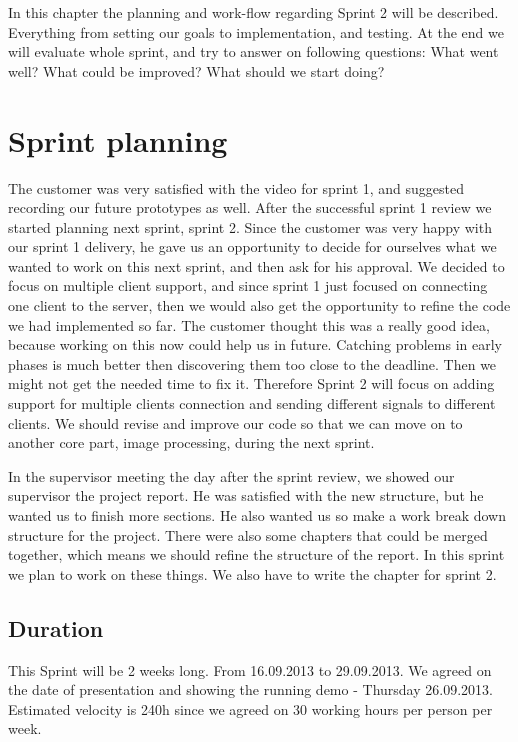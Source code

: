 In this chapter the planning and work-flow regarding Sprint 2 will be described. 
Everything from setting our goals to implementation, and testing. At the end we will evaluate whole sprint, and try to answer on following questions: What went well? What could be improved? What should we start doing? 

\section{Sprint planning}
The customer was very satisfied with the video for sprint 1, and suggested recording our future prototypes as well. 
After the successful sprint 1 review we started planning next sprint, sprint 2. Since the customer was very happy with our sprint 1 delivery, he gave us an opportunity to decide for ourselves what we wanted to work on this next sprint, and then ask for his approval. 
We decided to focus on multiple client support, and since sprint 1 just focused on connecting one client to the server, then we would also get the opportunity to refine the code we had implemented so far. The customer thought this was a really good idea, because working on this now could help us in future. Catching problems in early phases is much better then discovering them too close to the deadline. Then we might not get the needed time to fix it. Therefore Sprint 2 will focus on adding support for multiple clients connection and sending different signals to different clients. We should revise and improve our code so that we can move on to another core part, image processing, during the next sprint.


In the supervisor meeting the day after the sprint review, we showed our supervisor the project report. He was satisfied with the new structure, but he wanted us to finish more sections. He also wanted us so make a work break down structure for the project. There were also some chapters that could be merged together, which means we should refine the structure of the report. In this sprint we plan to work on these things. We also have to write the chapter for sprint 2.

\subsection{Duration}
This Sprint will be 2 weeks long. From 16.09.2013 to 29.09.2013.
We agreed on the date of presentation and showing the running demo - Thursday 26.09.2013.
Estimated velocity is 240h since we agreed on 30 working hours per person per week.

